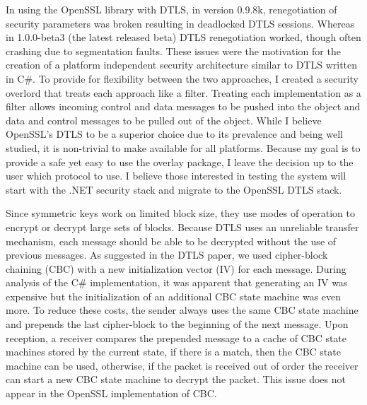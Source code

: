 In using the OpenSSL library with DTLS, in version 0.9.8k, renegotiation of
security parameters was broken resulting in deadlocked DTLS sessions.  Whereas
in 1.0.0-beta3 (the latest released beta) DTLS renegotiation worked, though often
crashing due to segmentation faults.  These issues were the motivation
for the creation of a platform independent security architecture similar to
DTLS written in C\#.  To provide for flexibility between the two approaches,
I created a security overlord that treats each approach like a filter.
Treating each implementation as a filter allows incoming control and data
messages to be pushed into the object and data and control messages to be
pulled out of the object.  While I believe OpenSSL's DTLS to be a superior
choice due to its prevalence and being well studied, it is non-trivial to make
available for all platforms.  Because my goal is to provide a safe yet easy to
use the overlay package, I leave the decision up to the user which protocol to
use.   I believe those interested in testing the system will start with the
.NET security stack and migrate to the OpenSSL DTLS stack.



Since symmetric keys work on limited block size, they use modes of operation
to encrypt or decrypt large sets of blocks.  Because DTLS uses an unreliable
transfer mechanism, each message should be able to be decrypted without the use
of previous messages.  As suggested in the DTLS paper, we used cipher-block
chaining (CBC) with a new initialization vector (IV) for each message.  During
analysis of the C\# implementation, it was apparent that generating an IV was
expensive but the initialization of an additional CBC state machine was even
more.  To reduce these costs, the sender always uses the same CBC state machine
and prepends the last cipher-block to the beginning of the next message.  Upon
reception, a receiver compares the prepended message to a cache of CBC state
machines stored by the current state, if there is a match, then the CBC state
machine can be used, otherwise, if the packet is received out of order the
receiver can start a new CBC state machine to decrypt the packet.  This issue
does not appear in the OpenSSL implementation of CBC.

